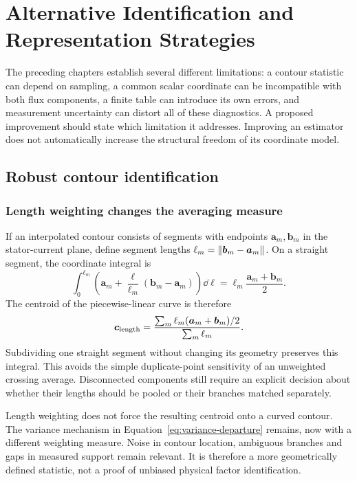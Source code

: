 \chapter{Alternative Identification and Representation Strategies}\label{ch:alternatives}

The preceding chapters establish several different limitations: a contour statistic can depend on sampling, a common scalar coordinate can be incompatible with both flux components, a finite table can introduce its own errors, and measurement uncertainty can distort all of these diagnostics. A proposed improvement should state which limitation it addresses. Improving an estimator does not automatically increase the structural freedom of its coordinate model.

\section{Robust contour identification}
\subsection{Length weighting changes the averaging measure}
If an interpolated contour consists of segments with endpoints $\bm a_m,\bm b_m$ in the stator-current plane, define segment lengths $\ell_m=\left\lVert\bm b_m-\bm a_m\right\rVert$. On a straight segment, the coordinate integral is
\begin{equation}
\int_0^{\ell_m}\left(\bm a_m+\frac{\ell}{\ell_m}(\bm b_m-\bm a_m)\right)\dd\ell
=\ell_m\frac{\bm a_m+\bm b_m}{2}.
\end{equation}
The centroid of the piecewise-linear curve is therefore
\begin{equation}
\bm c_{\rm length}=
\frac{\sum_m\ell_m(\bm a_m+\bm b_m)/2}{\sum_m\ell_m}.
\end{equation}
Subdividing one straight segment without changing its geometry preserves this integral. This avoids the simple duplicate-point sensitivity of an unweighted crossing average. Disconnected components still require an explicit decision about whether their lengths should be pooled or their branches matched separately.

Length weighting does not force the resulting centroid onto a curved contour. The variance mechanism in Equation~\eqref{eq:variance-departure} remains, now with a different weighting measure. Noise in contour location, ambiguous branches and gaps in measured support remain relevant. It is therefore a more geometrically defined statistic, not a proof of unbiased physical factor identification.

